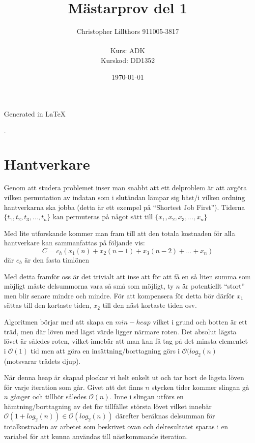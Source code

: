 \documentclass[a4paper,11pt,twoside]{article}
\title{Mästarprov del 1}
\author{
  Christopher Lillthors 911005-3817 \\
  \\
  Kurs: ADK \\
  Kurskod: DD1352
}
\date{\today}
\begin{document}
\maketitle
\tableofcontents
\begin{frame}
\null
\vfill
Generated in \LaTeX
\end{frame}
\thispagestyle{empty}.
\newpage
\clearpage
\setcounter{page}{1}

\renewcommand{\algorithmicrequire}{\textbf{Input:}}
\renewcommand{\algorithmicensure}{\textbf{Output:}}

\section{Hantverkare}

Genom att studera problemet inser man snabbt att ett delproblem är att avgöra vilken permutation
av indatan som i slutändan lämpar sig bäst/i vilken ordning hantverkarna ska jobba (detta är ett exempel på ``Shortest Job First'').
Tiderna $\{t_1,t_2,t_3,\dotsc,t_n\}$ kan permuteras på något sätt till $\{x_1,x_2,x_3,\dotsc,x_n\}$

Med lite utforskande kommer man fram till att den totala kostnaden för alla hantverkare kan sammanfattas på följande vis:\\
\begin{equation}\label{total_cost}
  C = c_h ({x_1(n)+x_2(n-1) + x_3(n-2) + \dotsc + x_n})
\end{equation}
där $c_h$ är den fasta timlönen

Med detta framför oss är det trivialt att inse att för att få en så liten summa som möjligt måste delsummorna vara så små som möjligt, ty $n$ är potentiellt ``stort'' men blir senare mindre och mindre. För att kompensera för detta bör därför $x_1$ sättas till den kortaste tiden, $x_2$ till den näst kortaste tiden osv.

Algoritmen börjar med att skapa en $min-heap$ vilket i grund och botten är ett träd, men där löven med lägst värde ligger närmare roten. Det absolut lägsta lövet är således roten, vilket innebär att man kan få tag på det minsta elementet i $\mathcal{O}(1)$ tid men att göra en insättning/borttagning görs i $\mathcal{O}(log_2(n)$ (motsvarar trädets djup).

När denna heap är skapad plockar vi helt enkelt ut och tar bort de lägsta löven för varje iteration som går. Givet att det finns $n$ stycken tider kommer slingan gå $n$ gånger och tillhör således $\mathcal{O}(n)$. Inne i slingan utförs en hämtning/borttagning av det för tillfället största lövet vilket innebär $\mathcal{O}(1 + log_2(n)) \in \mathcal{O}(log_2(n))$ därefter beräknas delsumman för totalkostnaden av arbetet som beskrivet ovan och delresultatet sparas i en variabel för att kunna användas till nästkommande iteration.
\end{document}
